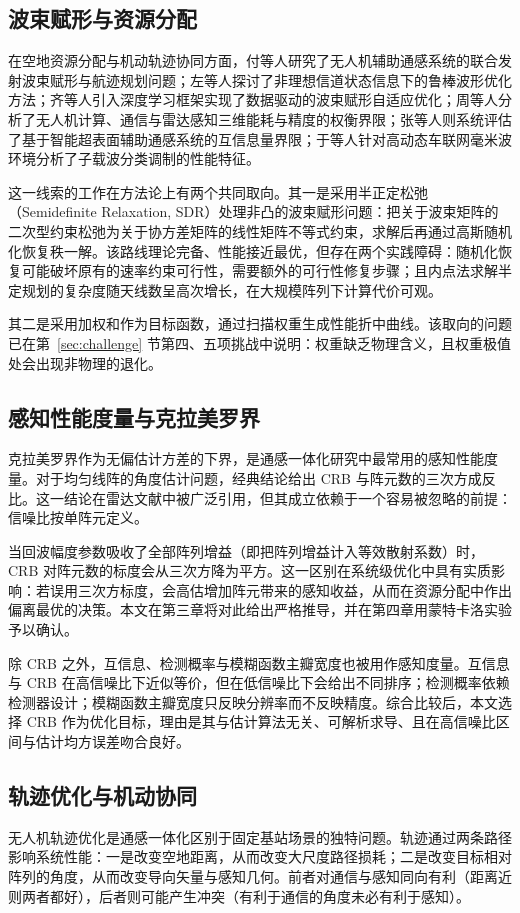 \subsection{波束赋形与资源分配}
在空地资源分配与机动轨迹协同方面，付等人研究了无人机辅助通感系统的联合发射波束赋形与航迹规划问题\cite{fu2024joint}；左等人探讨了非理想信道状态信息下的鲁棒波形优化方法\cite{zuo2025robust}；齐等人引入深度学习框架实现了数据驱动的波束赋形自适应优化\cite{qi2023based}；周等人分析了无人机计算、通信与雷达感知三维能耗与精度的权衡界限\cite{zhou2024trade}；张等人则系统评估了基于智能超表面辅助通感系统的互信息量界限\cite{zhang2022joint}；于等人针对高动态车联网毫米波环境分析了子载波分类调制的性能特征\cite{yu2024integrated}。

这一线索的工作在方法论上有两个共同取向。其一是采用半正定松弛（Semidefinite Relaxation, SDR）处理非凸的波束赋形问题：把关于波束矩阵的二次型约束松弛为关于协方差矩阵的线性矩阵不等式约束，求解后再通过高斯随机化恢复秩一解。该路线理论完备、性能接近最优，但存在两个实践障碍：随机化恢复可能破坏原有的速率约束可行性，需要额外的可行性修复步骤；且内点法求解半定规划的复杂度随天线数呈高次增长，在大规模阵列下计算代价可观。

其二是采用加权和作为目标函数，通过扫描权重生成性能折中曲线。该取向的问题已在第~\ref{sec:challenge} 节第四、五项挑战中说明：权重缺乏物理含义，且权重极值处会出现非物理的退化。

\subsection{感知性能度量与克拉美罗界}
克拉美罗界作为无偏估计方差的下界，是通感一体化研究中最常用的感知性能度量。对于均匀线阵的角度估计问题，经典结论给出 CRB 与阵元数的三次方成反比。这一结论在雷达文献中被广泛引用，但其成立依赖于一个容易被忽略的前提：信噪比按单阵元定义。

当回波幅度参数吸收了全部阵列增益（即把阵列增益计入等效散射系数）时，CRB 对阵元数的标度会从三次方降为平方。这一区别在系统级优化中具有实质影响：若误用三次方标度，会高估增加阵元带来的感知收益，从而在资源分配中作出偏离最优的决策。本文在第三章将对此给出严格推导，并在第四章用蒙特卡洛实验予以确认。

除 CRB 之外，互信息、检测概率与模糊函数主瓣宽度也被用作感知度量。互信息与 CRB 在高信噪比下近似等价，但在低信噪比下会给出不同排序；检测概率依赖检测器设计；模糊函数主瓣宽度只反映分辨率而不反映精度。综合比较后，本文选择 CRB 作为优化目标，理由是其与估计算法无关、可解析求导、且在高信噪比区间与估计均方误差吻合良好。

\subsection{轨迹优化与机动协同}
无人机轨迹优化是通感一体化区别于固定基站场景的独特问题。轨迹通过两条路径影响系统性能：一是改变空地距离，从而改变大尺度路径损耗；二是改变目标相对阵列的角度，从而改变导向矢量与感知几何。前者对通信与感知同向有利（距离近则两者都好），后者则可能产生冲突（有利于通信的角度未必有利于感知）。

